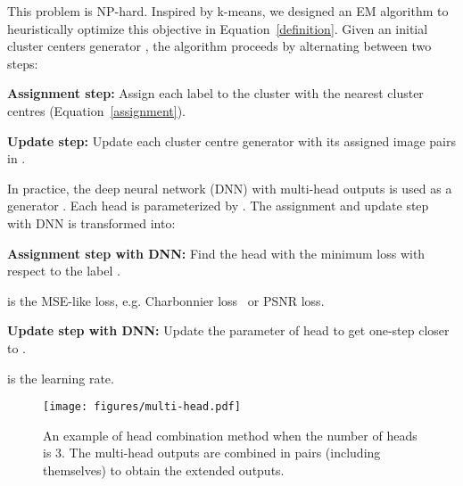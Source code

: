 \documentclass[letterpaper]{article} \usepackage{aaai23}  \usepackage{times}  \usepackage{helvet}  \usepackage{courier}  \usepackage[hyphens]{url}  \usepackage{graphicx} \urlstyle{rm} \def\UrlFont{\rm}  \usepackage{natbib}  \usepackage{caption} \frenchspacing  \setlength{\pdfpagewidth}{8.5in} \setlength{\pdfpageheight}{11in} \usepackage{algorithm}
\begin{document}
This problem is NP-hard. Inspired by k-means, we designed an EM algorithm to heuristically optimize this objective in Equation~\ref{definition}. Given an initial cluster centers generator , the algorithm proceeds by alternating between two steps:

\textbf{Assignment step:} Assign each label  to the cluster with the nearest cluster centres (Equation~\ref{assignment}).



\textbf{Update step:} Update each cluster centre generator  with its assigned image pairs in .



In practice, the deep neural network (DNN) with multi-head outputs is used as a generator . Each head  is parameterized by . The assignment and update step with DNN is transformed into:

\textbf{Assignment step with DNN:} Find the head  with the minimum loss  with respect to the label . 


 is the MSE-like loss, e.g. Charbonnier loss~\cite{charbonnier1994two} or PSNR loss.

\textbf{Update step with DNN:} Update the parameter  of head  to get one-step closer to .


 is the learning rate.







\begin{figure}
    \centering
    \texttt{[image: figures/multi-head.pdf]}
    \caption{An example of head combination method when the number of heads is 3. The multi-head outputs are combined in pairs (including themselves) to obtain the extended outputs.}
    \label{fig:multi-head}
\end{figure}
\end{document}
